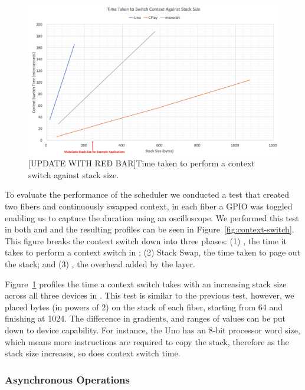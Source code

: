 \begin{figure}[ht]
    \includegraphics[width=.6\columnwidth]{images/context-vs-stack.png}
\caption{\label{fig:context-vs-stack}[UPDATE WITH RED BAR]Time taken to perform a context switch against stack size.}
\end{figure}

To evaluate the performance of the scheduler we conducted a test that created two fibers and continuously swapped context, in each fiber a GPIO was toggled enabling us to capture the duration using an oscilloscope. We performed this test in both \MC and \CO and the resulting profiles can be seen in Figure~\ref{fig:context-switch}. This figure breaks the context switch down into three phases: (1) \CO, the time it takes to perform a context switch in \CO; (2) Stack Swap, the time taken to page out the \MC stack; and (3) \MC, the overhead added by the \MC layer.

Figure~\ref{fig:context-vs-stack} profiles the time a context switch takes with an increasing stack size across all three devices in \CO. This test is similar to the previous test, however, we placed bytes (in powers of 2) on the stack of each fiber, starting from 64 and finishing at 1024. The difference in gradients, and ranges of values can be put down to device capability. For instance, the Uno has an 8-bit processor word size, which means more instructions are required to copy the stack, therefore as the stack size increases, so does context switch time.

\subsubsection{Asynchronous Operations}


